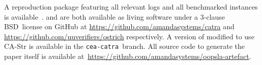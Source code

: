 A reproduction package featuring all relevant logs and all benchmarked instances is available~\cite{artefact}.
\Catra{} and \Ostrich{} are both available as living software
under a 3-clause BSD~license on GitHub at \url{https://github.com/amandasystems/catra} and \url{https://github.com/uuverifiers/ostrich}
respectively. A version of \Ostrich{} modified to use CA-Str is available in the \texttt{cea-catra}~branch. All source code to generate the paper itself
is available at~\url{https://github.com/amandasystems/oopsla-artefact}.